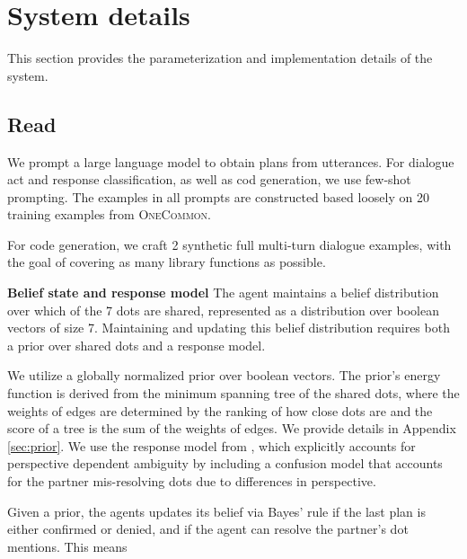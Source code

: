\documentclass[11pt]{article}
\begin{document}

\section{System details}
\label{sec:implementation}
This section provides the parameterization and implementation details of the system.

\subsection{Read}
\label{sec:read}
We prompt a large language model to obtain plans from utterances.
For dialogue act and response classification, as well as
cod generation, we use few-shot prompting.
The examples in all prompts are constructed based loosely on
20 training examples from \textsc{OneCommon}.

For code generation, we craft 2 synthetic full multi-turn dialogue examples,
with the goal of covering as many library functions as possible.

\textbf{Belief state and response model}
The agent maintains a belief distribution over which of the 7
dots are shared, represented as a distribution over boolean vectors of size 7.
Maintaining and updating this belief distribution requires both a prior over shared dots
and a response model.

We utilize a globally normalized prior over boolean vectors.
The prior's energy function is derived from the minimum spanning tree of the shared dots, where the weights of edges are determined by the ranking of how close dots are and the score of a tree is the sum of the weights of edges.
We provide details in Appendix \ref{sec:prior}.
We use the response model from \citep{ocp}, which explicitly accounts for perspective dependent ambiguity
by including a confusion model that accounts for the partner mis-resolving dots due to differences in perspective.

Given a prior, the agents updates its belief via Bayes' rule if the last plan is either confirmed or denied,
and if the agent can resolve the partner's dot mentions.
This means 
\end{document}
